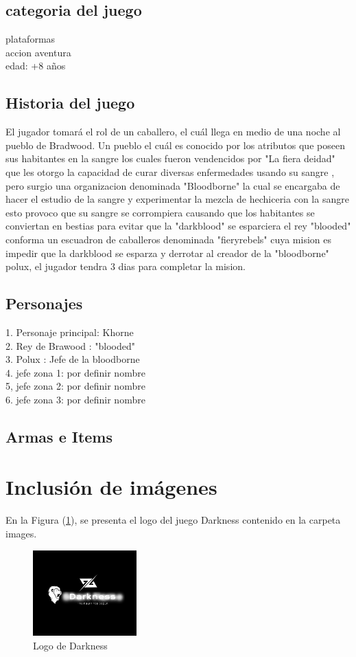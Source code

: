 \documentclass{article}
\begin{document}
\subsection{categoria del juego}
plataformas \\
accion aventura\\ 
edad: +8 años\\

\subsection{Historia del juego}
El jugador tomará el rol de un caballero, el cuál llega en medio de una noche al pueblo de Bradwood. Un pueblo el cuál es conocido por los atributos que poseen sus habitantes en la sangre los cuales fueron vendencidos por "La fiera deidad" que les otorgo la capacidad de curar diversas enfermedades usando su sangre , pero surgio una organizacion denominada "Bloodborne" la cual se encargaba de hacer el estudio de la sangre y experimentar la mezcla de hechiceria con la sangre esto provoco que su sangre se corrompiera causando que los habitantes se conviertan en bestias para evitar que la "darkblood" se esparciera el rey "blooded" conforma un escuadron de caballeros denominada "fieryrebels" cuya mision es impedir que la darkblood se esparza
y derrotar al creador de la "bloodborne" polux, el jugador tendra 3 dias para completar la mision.

\subsection{Personajes}

1. Personaje principal: Khorne\\
2. Rey de Brawood : "blooded"\\
3. Polux : Jefe de la bloodborne\\
4. jefe zona 1: por definir nombre\\
5, jefe zona 2: por definir nombre\\
6. jefe zona 3: por definir nombre\\

\subsection{Armas e Items}


\section{Inclusión de imágenes} \label{imagenes}

En la Figura (\ref{fig:Darkness}), se presenta el logo del juego Darkness contenido en la carpeta images.

\begin{figure}[h]
\includegraphics[width=4cm]{Darkness.PNG}
\centering
\caption{Logo de Darkness}
\label{fig:Darkness}
\end{figure}




\end{document}
